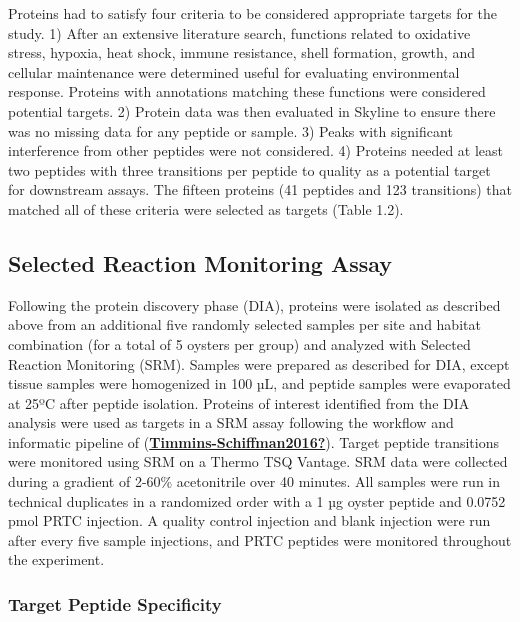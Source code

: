 \documentclass [11pt, proquest] {uwthesis}[2015/03/03]
\begin{document}
Proteins had to satisfy four criteria to be considered appropriate targets for the study. 1) After an extensive literature search, functions related to oxidative stress, hypoxia, heat shock, immune resistance, shell formation, growth, and cellular maintenance were determined useful for evaluating environmental response. Proteins with annotations matching these functions were considered potential targets. 2) Protein data was then evaluated in Skyline to ensure there was no missing data for any peptide or sample. 3) Peaks with significant interference from other peptides were not considered. 4) Proteins needed at least two peptides with three transitions per peptide to quality as a potential target for downstream assays. The fifteen proteins (41 peptides and 123 transitions) that matched all of these criteria were selected as targets (Table 1.2).

\hypertarget{selected-reaction-monitoring-assay}{%
\subsection{Selected Reaction Monitoring Assay}\label{selected-reaction-monitoring-assay}}

Following the protein discovery phase (DIA), proteins were isolated as described above from an additional five randomly selected samples per site and habitat combination (for a total of 5 oysters per group) and analyzed with Selected Reaction Monitoring (SRM). Samples were prepared as described for DIA, except tissue samples were homogenized in 100 µL, and peptide samples were evaporated at 25ºC after peptide isolation.
Proteins of interest identified from the DIA analysis were used as targets in a SRM assay following the workflow and informatic pipeline of (\protect\hyperlink{ref-Timmins-Schiffman2016}{\textbf{Timmins-Schiffman2016?}}). Target peptide transitions were monitored using SRM on a Thermo TSQ Vantage. SRM data were collected during a gradient of 2-60\% acetonitrile over 40 minutes. All samples were run in technical duplicates in a randomized order with a 1 µg oyster peptide and 0.0752 pmol PRTC injection. A quality control injection and blank injection were run after every five sample injections, and PRTC peptides were monitored throughout the experiment.

\hypertarget{target-peptide-specificity}{%
\subsubsection{Target Peptide Specificity}\label{target-peptide-specificity}}
\end{document}
